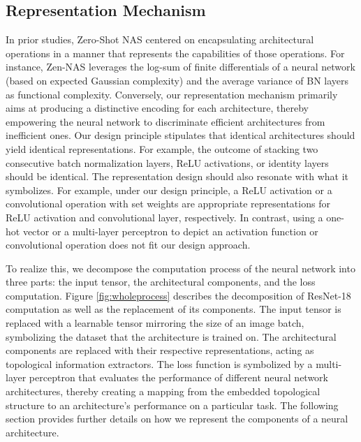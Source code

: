 \documentclass[lettersize,journal]{IEEEtran}
\begin{document}
\subsection{Representation Mechanism} \label{sec:representation_mechanism}
In prior studies, Zero-Shot NAS centered on encapsulating architectural operations in a manner that represents the capabilities of those operations. For instance, Zen-NAS \cite{Zen-NAS} leverages the log-sum of finite differentials of a neural network (based on expected Gaussian complexity) and the average variance of BN layers as functional complexity. Conversely, our representation mechanism primarily aims at producing a distinctive encoding for each architecture, thereby empowering the neural network to discriminate efficient architectures from inefficient ones. Our design principle stipulates that identical architectures should yield identical representations. For example, the outcome of stacking two consecutive batch normalization layers, ReLU activations, or identity layers should be identical. The representation design should also resonate with what it symbolizes. For example, under our design principle, a ReLU activation or a convolutional operation with set weights are appropriate representations for ReLU activation and convolutional layer, respectively. In contrast, using a one-hot vector or a multi-layer perceptron to depict an activation function or convolutional operation does not fit our design approach.

To realize this, we decompose the computation process of the neural network into three parts: the input tensor, the architectural components, and the loss computation. Figure \ref{fig:wholeprocess} describes the decomposition of ResNet-18 \cite{ResNet} computation as well as the replacement of its components. The input tensor is replaced with a learnable tensor mirroring the size of an image batch, symbolizing the dataset that the architecture is trained on. The architectural components are replaced with their respective representations, acting as topological information extractors. The loss function is symbolized by a multi-layer perceptron that evaluates the performance of different neural network architectures, thereby creating a mapping from the embedded topological structure to an architecture's performance on a particular task. The following section provides further details on how we represent the components of a neural architecture.
\end{document}
